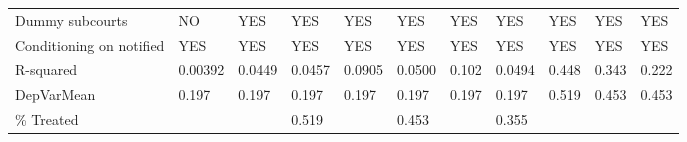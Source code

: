 \begin{tabular}{lrrlrlrlrrr}
Dummy subcourts & \multicolumn{1}{l}{NO} & \multicolumn{1}{l}{YES} & YES   & \multicolumn{1}{l}{YES} & YES   & \multicolumn{1}{l}{YES} & YES   & \multicolumn{1}{l}{YES} & \multicolumn{1}{l}{YES} & \multicolumn{1}{l}{YES} \\
Conditioning on notified & \multicolumn{1}{l}{YES} & \multicolumn{1}{l}{YES} & YES   & \multicolumn{1}{l}{YES} & YES   & \multicolumn{1}{l}{YES} & YES   & \multicolumn{1}{l}{YES} & \multicolumn{1}{l}{YES} & \multicolumn{1}{l}{YES} \\
R-squared & \multicolumn{1}{l}{0.00392} & \multicolumn{1}{l}{0.0449} & 0.0457 & \multicolumn{1}{l}{0.0905} & 0.0500 & \multicolumn{1}{l}{0.102} & 0.0494 & \multicolumn{1}{l}{0.448} & \multicolumn{1}{l}{0.343} & \multicolumn{1}{l}{0.222} \\
DepVarMean & \multicolumn{1}{l}{0.197} & \multicolumn{1}{l}{0.197} & 0.197 & \multicolumn{1}{l}{0.197} & 0.197 & \multicolumn{1}{l}{0.197} & 0.197 & \multicolumn{1}{l}{0.519} & \multicolumn{1}{l}{0.453} & \multicolumn{1}{l}{0.453} \\
\% Treated &       &       & 0.519 &       & 0.453 &       & 0.355 &       &       &  \\
\bottomrule
\bottomrule
\end{tabular}%

